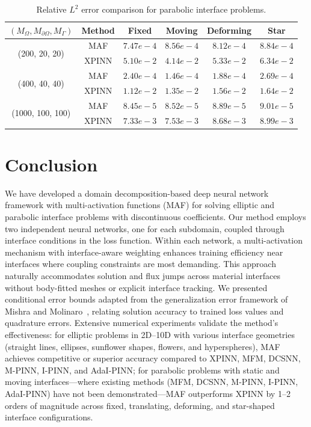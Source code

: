 \documentclass{article}
\begin{document}
\begin{table}[H]
    \centering
    \caption{Relative $L^2$ error comparison for parabolic interface problems.}
    \label{table:parabolic_summary}
    \small
    \begin{tabular}{|c|c|c|c|c|c|}
        \hline
        $(M_\Omega, M_{\partial\Omega}, M_\Gamma)$ & Method & Fixed & Moving & Deforming & Star \\
        \hline
        \multirow{2}{*}{(200, 20, 20)} & MAF & $7.47e{-}4$ & $8.56e{-}4$ & $8.12e{-}4$ & $8.84e{-}4$ \\
        & XPINN & $5.10e{-}2$ & $4.14e{-}2$ & $5.33e{-}2$ & $6.34e{-}2$ \\
        \hline
        \multirow{2}{*}{(400, 40, 40)} & MAF & $2.40e{-}4$ & $1.46e{-}4$ & $1.88e{-}4$ & $2.69e{-}4$ \\
        & XPINN & $1.12e{-}2$ & $1.35e{-}2$ & $1.56e{-}2$ & $1.64e{-}2$ \\
        \hline
        \multirow{2}{*}{(1000, 100, 100)} & MAF & $8.45e{-}5$ & $8.52e{-}5$ & $8.89e{-}5$ & $9.01e{-}5$ \\
        & XPINN & $7.33e{-}3$ & $7.53e{-}3$ & $8.68e{-}3$ & $8.99e{-}3$ \\
        \hline
    \end{tabular}
\end{table}










\section{Conclusion}
\label{Conclusion}

We have developed a domain decomposition-based deep neural network framework with multi-activation functions (MAF) for solving elliptic and parabolic interface problems with discontinuous coefficients. Our method employs two independent neural networks, one for each subdomain, coupled through interface conditions in the loss function. Within each network, a multi-activation mechanism with interface-aware weighting enhances training efficiency near interfaces where coupling constraints are most demanding. This approach naturally accommodates solution and flux jumps across material interfaces without body-fitted meshes or explicit interface tracking. We presented conditional error bounds adapted from the generalization error framework of Mishra and Molinaro~\cite{mishra2023estimates}, relating solution accuracy to trained loss values and quadrature errors. Extensive numerical experiments validate the method's effectiveness: for elliptic problems in 2D--10D with various interface geometries (straight lines, ellipses, sunflower shapes, flowers, and hyperspheres), MAF achieves competitive or superior accuracy compared to XPINN, MFM, DCSNN, M-PINN, I-PINN, and AdaI-PINN; for parabolic problems with static and moving interfaces---where existing methods (MFM, DCSNN, M-PINN, I-PINN, AdaI-PINN) have not been demonstrated---MAF outperforms XPINN by 1--2 orders of magnitude across fixed, translating, deforming, and star-shaped interface configurations.
\end{document}
